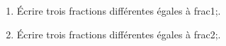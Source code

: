 \documentclass[exercice]{thedocument}%
\begin{document}
%
\begin{enumerate}
    \item Écrire trois fractions différentes égales à \<frac1;.
    \item Écrire trois fractions différentes égales à \<frac2;.
\end{enumerate}
\end{document}
